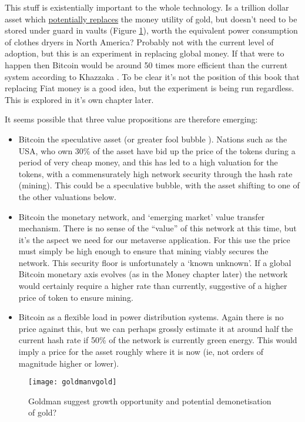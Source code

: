 This stuff is existentially important to the whole technology. Is a trillion dollar asset which \href{https://www.theheldreport.com/p/bitcoin-vs-gold}{potentially replaces} the money utility of gold, but doesn't need to be stored under guard in vaults (Figure \ref{fig:goldmanVgold}), worth the equivalent power consumption of clothes dryers in North America? Probably not with the current level of adoption, but this is an experiment in replacing global money. If that were to happen then Bitcoin would be around 50 times more efficient than the current system according to Khazzaka \cite{khazzaka2022bitcoin}. To be clear it's not the position of this book that replacing Fiat money is a good idea, but the experiment is being run regardless. This is explored in it's own chapter later.\par
It seems possible that three value propositions are therefore emerging:
\begin{itemize}
\item Bitcoin the speculative asset (or greater fool bubble \cite{de1990positive}). Nations such as the USA, who own 30\% of the asset have bid up the price of the tokens during a period of very cheap money, and this has led to a high valuation for the tokens, with a commensurately high network security through the hash rate (mining). This could be a speculative bubble, with the asset shifting to one of the other valuations below.
\item Bitcoin the monetary network, and `emerging market' value transfer mechanism. There is no sense of the ``value'' of this network at this time, but it's the aspect we need for our metaverse application. For this use the price must simply be high enough to ensure that mining viably secures the network. This security floor is unfortunately a `known unknown'. If a global Bitcoin monetary axis evolves (as in the Money chapter later) the network would certainly require a higher rate than currently, suggestive of a higher price of token to ensure mining.
\item Bitcoin as a flexible load in power distribution systems. Again there is no price against this, but we can perhaps grossly estimate it at around half the current hash rate if 50\% of the network is currently green energy. This would imply a price for the asset roughly where it is now (ie, not orders of magnitude higher or lower).  
\end{itemize}
\begin{figure}
  \centering
    \texttt{[image: goldmanvgold]}
  \caption{Goldman suggest growth opportunity and potential demonetisation of gold?}
  \label{fig:goldmanVgold}
\end{figure}
